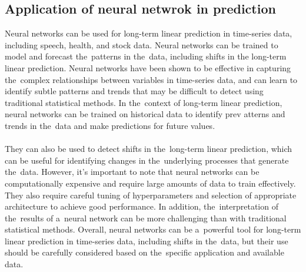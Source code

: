     \subsection{Application of neural netwrok in prediction} \label{subsec:nnprediction}
    Neural networks can be used for long-term linear prediction in time-series data, including speech, health, and stock data. Neural networks can be trained to model and forecast the~patterns in the~data, including shifts in the long-term linear prediction. Neural networks have been shown to be effective in capturing the~complex relationships between variables in time-series data, and can learn to identify subtle patterns and trends that may be difficult to detect using traditional statistical methods. In the~context of long-term linear prediction, neural networks can be trained on historical data to identify prev    atterns and trends in the~data and make predictions for future values.\\
    \\
    They can also be used to detect shifts in the~long-term linear prediction, which can be useful for identifying changes in the~underlying processes that generate the~data. However, it's important to note that neural networks can be computationally expensive and require large amounts of data to train effectively. They also require careful tuning of hyperparameters and selection of appropriate architecture to achieve good performance. In addition, the~interpretation of the~results of a~neural network can be more challenging than with traditional statistical methods. Overall, neural networks can be a~powerful tool for long-term linear prediction in time-series data, including shifts in the~data, but their use should be carefully considered based on the~specific application and available data.
    \\